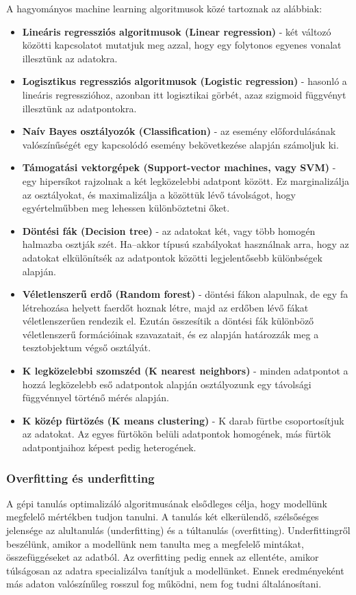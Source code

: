 A hagyományos machine learning algoritmusok közé tartoznak az alábbiak:

\begin{itemize}
\item \textbf{Lineáris regressziós algoritmusok (Linear regression)} - két változó közötti kapcsolatot mutatjuk meg azzal, hogy egy folytonos egyenes vonalat illesztünk az adatokra.
\item \textbf{Logisztikus regressziós algoritmusok (Logistic regression)} - hasonló a lineáris regresszióhoz, azonban itt logisztikai görbét, azaz szigmoid függvényt illesztünk az adatpontokra.
\item \textbf{Naív Bayes osztályozók (Classification)} - az esemény előfordulásának valószínűségét egy kapcsolódó esemény bekövetkezése alapján számoljuk ki.
\item \textbf{Támogatási vektorgépek (Support-vector machines, vagy SVM)} - egy hipersíkot rajzolnak a két legközelebbi adatpont között. Ez marginalizálja az osztályokat, és maximalizálja a közöttük lévő távolságot, hogy egyértelműbben meg lehessen különböztetni őket.
\item \textbf{Döntési fák (Decision tree)} - az adatokat két, vagy több homogén halmazba osztják szét. Ha–akkor típusú szabályokat használnak arra, hogy az adatokat elkülönítsék az adatpontok közötti legjelentősebb különbségek alapján.
\item \textbf{Véletlenszerű erdő (Random forest)} - döntési fákon alapulnak, de egy fa létrehozása helyett faerdőt hoznak létre, majd az erdőben lévő fákat véletlenszerűen rendezik el. Ezután összesítik a döntési fák különböző véletlenszerű formációinak szavazatait, és ez alapján határozzák meg a tesztobjektum végső osztályát.
\item \textbf{K legközelebbi szomszéd (K nearest neighbors)} - minden adatpontot a hozzá legközelebb eső adatpontok alapján osztályozunk egy távolsági függvénnyel történő mérés alapján. 
\item \textbf{K közép fürtözés (K means clustering)} - K darab fürtbe csoportosítjuk az adatokat. Az egyes fürtökön belüli adatpontok homogének, más fürtök adatpontjaihoz képest pedig heterogének. \cite{azure}
\end{itemize}


\subsubsection{Overfitting és underfitting}

A gépi tanulás optimalizáló algoritmusának elsődleges célja, hogy modellünk megfelelő mértékben tudjon tanulni. A tanulás két elkerülendő, szélsőséges jelensége az alultanulás (underfitting) és a túltanulás (overfitting). Underfittingről beszélünk, amikor a modellünk nem tanulta meg a megfelelő mintákat, összefüggéseket az adatból. Az overfitting pedig ennek az ellentéte, amikor túlságosan az adatra specializálva tanítjuk a modellünket. Ennek eredményeként más adaton valószínűleg rosszul fog működni, nem fog tudni általánosítani.

